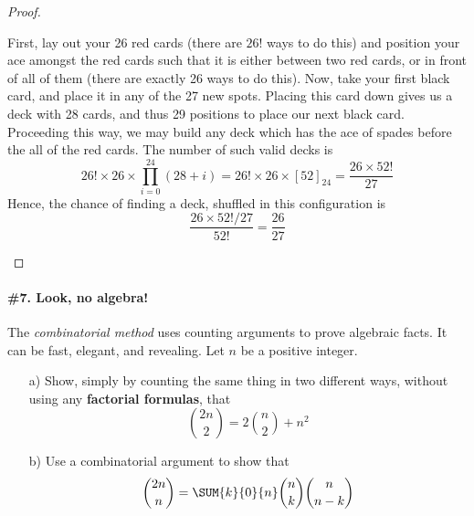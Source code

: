 \documentclass[12pt,titlepage]{article}
\begin{document}
\begin{proof}
\begin{enumerate}
First, lay out your 26 red cards (there are $26!$ ways to do this) and position your ace amongst the red cards such that it is either between two red cards, or in front of all of them (there are exactly 26 ways to do this). Now, take your first black card, and place it in any of the 27 new spots. Placing this card down gives us a deck with 28 cards, and thus 29 positions to place our next black card. Proceeding this way, we may build any deck which has the ace of spades before the all of the red cards. The number of such valid decks is
\[
26! \times 26 \times \prod_{i=0}^{24}(28+i) = 26! \times 26 \times [52]_{24} = \frac{26 \times 52!}{27}
\]
Hence, the chance of finding a deck, shuffled in this configuration is 
\[
\frac{26 \times 52!/27}{52!} = \frac{26}{27}
\]
\end{enumerate}
\end{proof}

\paragraph{\#7. Look, no algebra!} The \textit{combinatorial method} uses counting arguments to prove algebraic facts. It can be fast, elegant, and revealing. Let $n$ be a positive integer. 
\begin{enumerate}
\item[a)] Show, simply by counting the same thing in two different ways, without using any \textbf{factorial formulas}, that
\[
\binom{2n}{2} = 2\binom{n}{2} + n^2
\]
\item[b)] Use a combinatorial argument to show that
\[
\binom{2n}{n} = \SUM{k}{0}{n} \binom{n}{k}\binom{n}{n-k}
\]
\end{enumerate}
\end{document}

